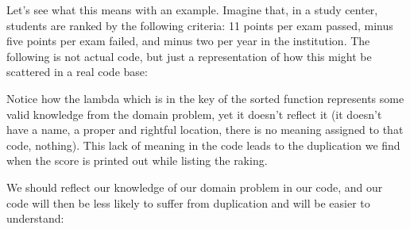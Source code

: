 \documentclass[a4paper,10pt,english]{sphinxmanual}
\begin{document}
Let’s see what this means with an example. Imagine that, in a study center, students are ranked by the
following criteria: 11 points per exam passed, minus five points per exam failed, and minus two per year in
the institution. The following is not actual code, but just a representation of how this might be scattered in
a real code base:

\begin{sphinxVerbatim}[commandchars=\\\{\}]
 
                   

       
\end{sphinxVerbatim}

Notice how the lambda which is in the key of the sorted function represents some valid knowledge from the
domain problem, yet it doesn’t reflect it (it doesn’t have a name, a proper and rightful location, there is no
meaning assigned to that code, nothing). This lack of meaning in the code leads to the duplication we find
when the score is printed out while listing the raking.

We should reflect our knowledge of our domain problem in our code, and our code will then be less likely to
suffer from duplication and will be easier to understand:
\end{document}
